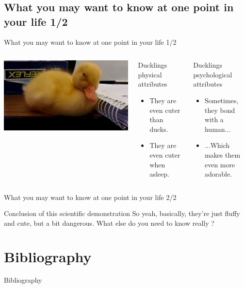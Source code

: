 \documentclass[11pt]{beamer}
\begin{document}
\subsection{What you may want to know at one point in your life 1/2}
\begin{frame}{What you may want to know at one point in your life 1/2}
    \begin{columns}[c] %
        \includegraphics[width = .8\textwidth]{sleepyduck.jpg}
        \pause
        \begin{block}{Ducklings physical attributes}
            \begin{itemize}
                \item They are even cuter than ducks.
                \item They are even cuter when asleep.
            \end{itemize}
        \end{block}
		\pause
        \begin{block}{Ducklings psychological attributes}
            \begin{itemize}
                \item Sometimes, they bond with a human...
                \item ...Which makes them even more adorable.
            \end{itemize}
        \end{block}
    \end{columns}
\end{frame}

\begin{frame}{What you may want to know at one point in your life 2/2}
\begin{block}{Conclusion of this scientific demonstration}
So yeah, basically, they're just fluffy and cute, but a bit dangerous. What else do you need to know really ?
\end{block}
\end{frame}
\section{Bibliography}

\begin{frame}{Bibliography}


\end{frame}
\end{document}

